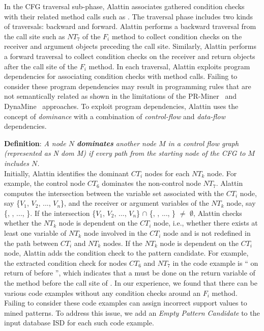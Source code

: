 In the CFG traversal sub-phase, Alattin associates gathered condition checks with their related method calls such as . The traversal phase includes two kinds of traversals: backward and forward. Alattin performs a backward traversal from the call site such as $NT_7$ of the $F_i$ method to collect condition checks on the receiver and argument objects preceding the call site. Similarly, Alattin performs a forward traversal to collect condition checks on the receiver and return objects after the call site of the $F_i$ method. In each traversal, Alattin exploits program dependencies for associating condition checks with method calls. Failing to consider these program dependencies may result in programming rules that are not semantically related as shown in the limitations of the PR-Miner~\cite{Zhenmin2005PRMiner} and DynaMine~\cite{livshits05dynamine} approaches. To exploit program dependencies, Alattin uses the concept of \emph{dominance} with a combination of \emph{control-flow} and \emph{data-flow} dependencies.

\textbf{Definition}: \emph{A node $N$ \textbf{dominates} another node $M$ in a control flow graph (represented as N dom M) if every path from the starting node of the CFG to $M$ includes $N$.}\\

Initially, Alattin identifies the dominant $CT_i$ nodes for each $NT_k$ node. For example, the control node $CT_6$ dominates the non-control node $NT_7$. Alattin computes the intersection between the variable set associated with
the $CT_i$ node, say \{$V_1$, $V_2$, ..., $V_n$\}, and the receiver or argument variables of the $NT_k$ node, say \{, , ..., \}. If the intersection  \{$V_1$, $V_2$, ..., $V_n$\} $\cap$ \{, , ..., \} $\neq$ $\emptyset$, Alattin checks whether the $NT_k$ node is dependent on the $CT_i$ node, i.e., whether there exists at least one variable of $NT_k$ node involved in the $CT_i$ node and is not redefined in the path between $CT_i$ and $NT_k$ nodes. If the $NT_k$ node is dependent on the $CT_i$ node, Alattin adds the condition check to the pattern candidate. For example, the extracted condition check for nodes $CT_6$ and $NT_7$ in the code example is `` on return of  before '', which indicates that a  must be done on the return variable of the  method before the call site of .  In our experience, we found that there can be various code examples without any condition checks around an $F_i$ method. Failing to consider these code examples can assign incorrect support values to mined patterns. To address this issue, we add an \emph{Empty Pattern Candidate} to the input database ISD for each such code example.
